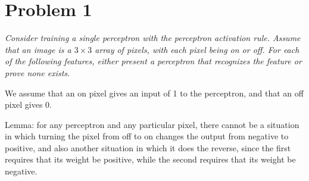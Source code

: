 \documentclass{article}
\begin{document}
  \section*{Problem 1}
  \textit{Consider training a single perceptron with the perceptron
    activation rule.  Assume that an image is a $3\times 3$ array of
    pixels, with each pixel being on or off. For each of the following
    features, either present a perceptron that recognizes the feature
    or prove none exists.}

  We assume that an on pixel gives an input of 1 to the perceptron,
  and that an off pixel gives 0.

  Lemma: for any perceptron and any particular pixel, there cannot be
  a situation in which turning the pixel from off to on changes the
  output from negative to positive, and also another situation in
  which it does the reverse, since the first requires that its weight
  be positive, while the second requires that its weight be negative.
\end{document}
